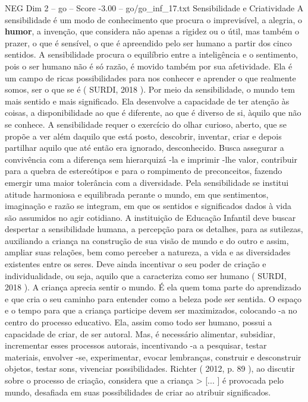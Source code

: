\begin{textsample}{NEG Dim 2 – go – Score -3.00 – go/go\_inf\_17.txt}
Sensibilidade e Criatividade A sensibilidade é um modo de conhecimento que procura o imprevisível, a alegria, o \textbf{humor}, a invenção, que considera não apenas a rigidez ou o útil, mas também o prazer, o que é sensível, o que é apreendido pelo ser humano a partir dos cinco sentidos.
A sensibilidade procura o equilíbrio entre a inteligência e o sentimento, pois o ser humano não é só razão, é movido também por sua afetividade.
Ela é um campo de ricas possibilidades para nos conhecer e aprender o que realmente somos, ser o que se é ( SURDI, 2018 ).
Por meio da sensibilidade, o mundo tem mais sentido e mais significado.
Ela desenvolve a capacidade de ter atenção às coisas, a disponibilidade ao que é diferente, ao que é diverso de si, àquilo que não se conhece.
A sensibilidade requer o exercício do olhar curioso, aberto, que se propõe a ver além daquilo que está posto, descobrir, inventar, criar e depois partilhar aquilo que até então era ignorado, desconhecido.
Busca assegurar a convivência com a diferença sem hierarquizá -la e imprimir -lhe valor, contribuir para a quebra de estereótipos e para o rompimento de preconceitos, fazendo emergir uma maior tolerância com a diversidade.
Pela sensibilidade se institui atitude harmoniosa e equilibrada perante o mundo, em que sentimentos, imaginação e razão se integram, em que os sentidos e significados dados à vida são assumidos no agir cotidiano.
A instituição de Educação Infantil deve buscar despertar a sensibilidade humana, a percepção para os detalhes, para as sutilezas, auxiliando a criança na construção de sua visão de mundo e do outro e assim, ampliar suas relações, bem como perceber a natureza, a vida e as diversidades existentes entre os seres.
Deve ainda incentivar o seu poder de criação e individualidade, ou seja, aquilo que a caracteriza como ser humano ( SURDI, 2018 ).
A criança aprecia sentir o mundo.
É ela quem toma parte do aprendizado e que cria o seu caminho para entender como a beleza pode ser sentida.
O espaço e o tempo para que a criança participe devem ser maximizados, colocando -a no centro do processo educativo.
Ela, assim como todo ser humano, possui a capacidade de criar, de ser autoral.
Mas, é necessário alimentar, subsidiar, incrementar esses processos autorais, incentivando -a a pesquisar, testar materiais, envolver -se, experimentar, evocar lembranças, construir e desconstruir objetos, testar sons, vivenciar possibilidades.
Richter ( 2012, p. 89 ), ao discutir sobre o processo de criação, considera que a criança > [... ] é provocada pelo mundo, desafiada em suas possibilidades de criar ao atribuir significados.

\end{textsample}
